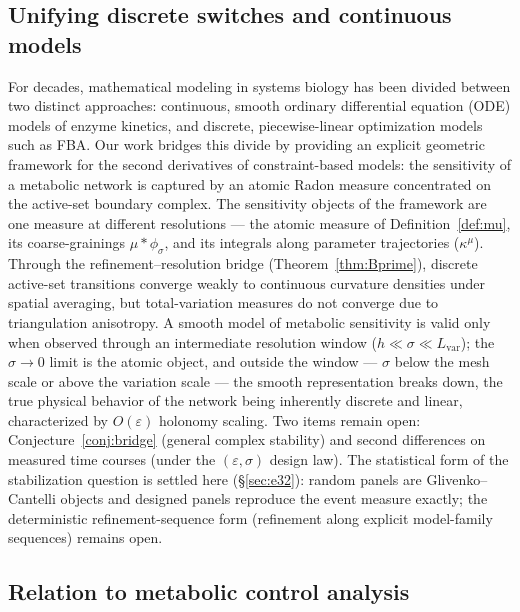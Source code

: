 \documentclass[11pt,a4paper]{article}
\theoremstyle{plain}
\theoremstyle{definition}
\theoremstyle{remark}
\newcommand{\kmu}{\kappa^{\mu}}
\begin{document}
\subsection{Unifying discrete switches and continuous models}
For decades, mathematical modeling in systems biology has been
divided between two distinct approaches: continuous, smooth ordinary
differential equation (ODE) models of enzyme kinetics, and discrete,
piecewise-linear optimization models such as FBA. Our work bridges
this divide by providing an explicit geometric framework for the
second derivatives of constraint-based models: the sensitivity of a
metabolic network is captured by an atomic Radon measure concentrated
on the active-set boundary complex. The sensitivity objects of the
framework are one measure at different resolutions --- the atomic
measure of Definition~\ref{def:mu}, its coarse-grainings $\mu *
\phi_\sigma$, and its integrals along parameter trajectories
($\kmu$). Through the refinement--resolution bridge
(Theorem~\ref{thm:Bprime}), discrete active-set transitions converge
weakly to continuous curvature densities under spatial averaging, but
total-variation measures do not converge due to triangulation
anisotropy. A smooth model of metabolic sensitivity is valid only
when observed through an intermediate resolution window ($h \ll
\sigma \ll L_{\mathrm{var}}$); the $\sigma \to 0$ limit is the atomic
object, and outside the window --- $\sigma$ below the mesh scale or
above the variation scale --- the smooth representation breaks down,
the true physical behavior of the network being inherently discrete
and linear, characterized by $O(\varepsilon)$ holonomy scaling. Two
items remain open: Conjecture~\ref{conj:bridge} (general complex
stability) and second differences on measured time courses (under the
$(\varepsilon, \sigma)$ design law). The statistical form of the
stabilization question is settled here (\S\ref{sec:e32}): random
panels are Glivenko--Cantelli objects and designed panels reproduce
the event measure exactly; the deterministic refinement-sequence form
(refinement along explicit model-family sequences) remains open.

\subsection{Relation to metabolic control analysis}\label{sec:mca}
\end{document}
